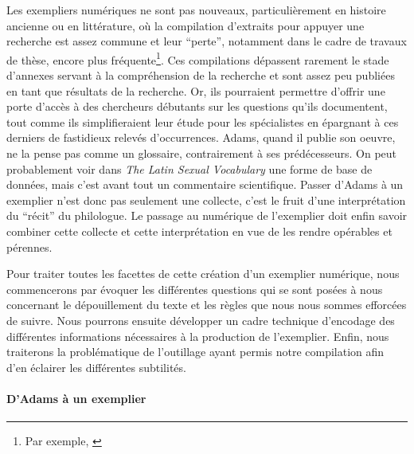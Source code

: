 Les exempliers numériques ne sont pas nouveaux, particulièrement en histoire ancienne ou en littérature, où la compilation d'extraits pour appuyer une recherche est assez commune et leur \enquote{perte}, notamment dans le cadre de travaux de thèse, encore plus fréquente\footnote{Par exemple, \textcite{castelli__2020, montreuil_histoire_2016}}. Ces compilations dépassent rarement le stade d'annexes servant à la compréhension de la recherche et sont assez peu publiées en tant que résultats de la recherche. Or, ils pourraient permettre d'offrir une porte d'accès à des chercheurs débutants sur les questions qu'ils documentent, tout comme ils simplifieraient leur étude pour les spécialistes en épargnant à ces derniers de fastidieux relevés d'occurrences. Adams, quand il publie son oeuvre, ne la pense pas comme un glossaire, contrairement à ses prédécesseurs. On peut probablement voir dans \textit{The Latin Sexual Vocabulary} une forme de base de données, mais c'est avant tout un commentaire scientifique. Passer d'Adams à un exemplier n'est donc pas seulement une collecte, c'est le fruit d'une interprétation du \enquote{récit} du philologue. Le passage au numérique de l'exemplier doit enfin savoir combiner cette collecte et cette interprétation en vue de les rendre opérables et pérennes.

Pour traiter toutes les facettes de cette création d'un exemplier numérique, nous commencerons par évoquer les différentes questions qui se sont posées à nous concernant le dépouillement du texte et les règles que nous nous sommes efforcées de suivre. Nous pourrons ensuite développer un cadre technique d'encodage des différentes informations nécessaires à la production de l'exemplier. Enfin, nous traiterons la problématique de l'outillage ayant permis notre compilation afin d'en éclairer les différentes subtilités.

\paragraph{D'Adams à un exemplier}

